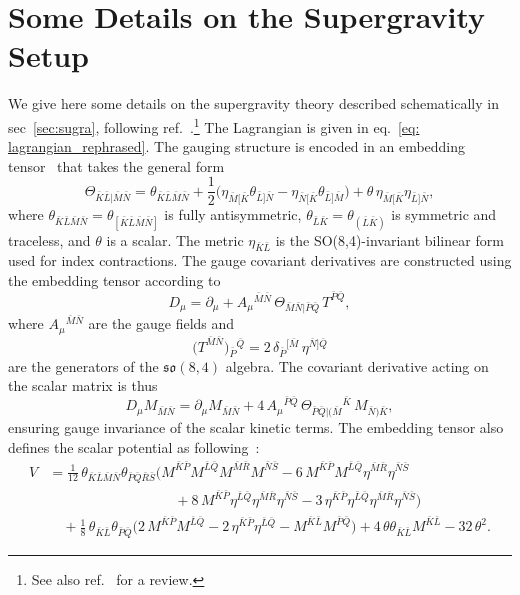 \documentclass[11pt,a4paper]{article}
\newcommand{\bK}{{\bar{K}}}
\newcommand{\bL}{{\bar{L}}}
\newcommand{\bM}{{\bar{M}}}
\newcommand{\bN}{{\bar{N}}}
\newcommand{\bP}{{\bar{P}}}
\newcommand{\bQ}{{\bar{Q}}}
\newcommand{\bR}{{\bar{R}}}
\newcommand{\bS}{{\bar{S}}}
\begin{document}
\section{Some Details on the Supergravity Setup} \label{app:sugra}
We give here some details on the supergravity theory described schematically in sec~\ref{sec:sugra}, following ref.~\cite{Nicolai:2001ac,deWit:2003ja}.\footnote{See also ref.~\cite{Eloy:2021qol} for a review.} The Lagrangian is given in eq.~\eqref{eq: lagrangian_rephrased}. The gauging structure is encoded in an embedding tensor~\cite{Nicolai:2000sc,deWit:2002vt} that takes the general form
%
\begin{equation}	\label{eq: embtensor_rephrased}
	\Theta_{\bK\bL\vert\bM\bN}=\theta_{\bK\bL\bM\bN}+\frac12\Big(\eta_{\bM[\bK}\theta_{\bL]\bN}-\eta_{\bN[\bK}\theta_{\bL]\bM}\Big)+\theta\,\eta_{\bM[\bK}\eta_{\bL]\bN},
\end{equation}
%
where $\theta_{\bK\bL\bM\bN}=\theta_{[\bK\bL\bM\bN]}$ is fully antisymmetric, $\theta_{\bL\bK}=\theta_{(\bL\bK)}$ is symmetric and traceless, and $\theta$ is a scalar. The metric $\eta_{\bK\bL}$ is the SO(8,4)-invariant bilinear form used for index contractions. The gauge covariant derivatives are constructed using the embedding tensor according to
%
\begin{equation}
	D_\mu =\partial_\mu + A_\mu{}^{\bM\bN}\,\Theta_{\bM\bN\vert\bP\bQ}\, T^{\bP\bQ},
\end{equation}
%
where $A_\mu{}^{\bM\bN}$ are the gauge fields and
%
\begin{equation} \label{eq:so84gen_rephrased}
	\big(T^{\bar M\bar N}\big){}_{\bar P}{}^{\bar Q} = 2\,\delta_{\bar P}{}^{[\bar M}\,\eta^{\bar N]\bar Q}
\end{equation}
%
are the generators of the $\mathfrak{so}(8,4)$ algebra. The covariant derivative acting on the scalar matrix is thus
%
\begin{equation}
	D_\mu M_{\bM\bN}=\partial_\mu M_{\bM\bN}+4\,A_\mu{}^{\bP\bQ}\,\Theta_{\bP\bQ\vert(\bM}{}^{\bK}\, M_{\bN)\bK},
\end{equation}
%
ensuring gauge invariance of the scalar kinetic terms. The embedding tensor also defines the scalar potential as following~\cite{Samtleben:2019zrh,Schon:2006kz}:
%
{\setlength\arraycolsep{1.2pt}
	\begin{equation}	\label{eq: scalarpot_rephrased}
		\begin{aligned}
			V	&=	\frac1{12}\,\theta_{\bK\bL\bM\bN}\theta_{\bP\bQ\bR\bS}\Big(M^{\bK\bP}M^{\bL\bQ}M^{\bM\bR}M^{\bN\bS}-6\,M^{\bK\bP}M^{\bL\bQ}\eta^{\bM\bR}\eta^{\bN\bS}\\
			&\qquad\qquad\qquad\qquad\quad+8\,M^{\bK\bP}\eta^{\bL\bQ}\eta^{\bM\bR}\eta^{\bN\bS}-3\,\eta^{\bK\bP}\eta^{\bL\bQ}\eta^{\bM\bR}\eta^{\bN\bS}\Big)\\
			&\quad +\frac1{8}\,\theta_{\bK\bL}\theta_{\bP\bQ}\Big(2\,M^{\bK\bP}M^{\bL\bQ}-2\,\eta^{\bK\bP}\eta^{\bL\bQ}-M^{\bK\bL}M^{\bP\bQ}\Big)+4\,\theta\theta_{\bK\bL}M^{\bK\bL}-32\,\theta^2.
		\end{aligned}
	\end{equation}
}
\end{document}
